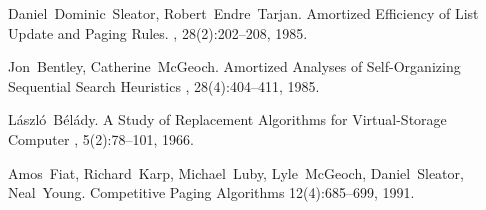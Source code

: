 \documentclass[11pt]{article}
\begin{document}


\begin{thebibliography}{42}

Daniel~Dominic~Sleator, Robert~Endre~Tarjan.
\newblock Amortized Efficiency of List Update and Paging Rules.
, 28(2):202--208, 1985.

Jon~Bentley, Catherine~McGeoch.
\newblock Amortized Analyses of Self-Organizing Sequential Search Heuristics
, 28(4):404--411, 1985.

L\'{a}szl\'{o}~B\'{e}l\'{a}dy.
\newblock A Study of Replacement Algorithms for Virtual-Storage Computer
, 5(2):78--101, 1966.

Amos~Fiat, Richard~Karp, Michael~Luby, Lyle~McGeoch, Daniel~Sleator, Neal~Young.
\newblock Competitive Paging Algorithms
 12(4):685--699, 1991.

\end{thebibliography}
\end{document}
